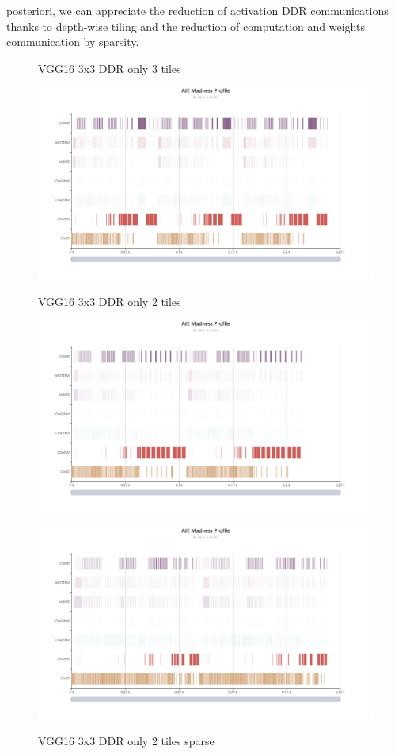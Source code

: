 \documentclass[conference]{IEEEtran}
\begin{document}
posteriori, we can appreciate the reduction of activation DDR
communications thanks to depth-wise tiling and the reduction of
computation and weights communication by sparsity. 
\begin{figure}[htb]
\centering 
\caption{VGG16 3x3 DDR only 3 tiles}
\includegraphics[width=0.99\linewidth]{vgg3tiles.png}
\label{vgg3tiles}
\caption{VGG16 3x3 DDR only 2 tiles}
\includegraphics[width=0.99\linewidth]{vgg2tiles.png}
\label{vgg2tiles}
\caption{VGG16 3x3 DDR only 2 tiles sparse}
\includegraphics[width=0.99\linewidth]{vgg2tilessparse.png}
\label{vgg2tilessparse}
\end{figure}
\end{document}
